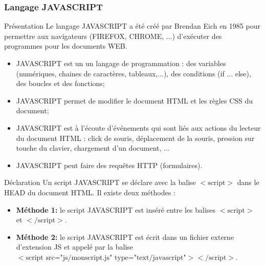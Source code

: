 \documentclass[8pt]{beamer}
\newcounter{num}
\begin{document}
\begin{frame}
\frametitle{Langage JAVASCRIPT}

\begin{block}{Présentation}
Le langage JAVASCRIPT a été créé par Brendan Eich en 1985 pour permettre aux navigateurs (FIREFOX, CHROME, ...) d'exécuter des programmes pour les documents WEB. 
\begin{itemize}
\item JAVASCRIPT est un un langage de programmation : des variables (numériques, chaines de caractères, tableaux,...), des conditions (if ... else), des boucles et des fonctions;
\item JAVASCRIPT permet de modifier le document HTML et les règles CSS du document;
\item JAVASCRIPT est à l'écoute d'événements qui sont liés aux actions du lecteur du document HTML : click de souris, déplacement de la souris, pression sur touche du clavier, chargement d'un document, ...
\item JAVASCRIPT peut faire des requêtes HTTP (formulaires).
\end{itemize}
\end{block}

\begin{block}{Déclaration}
Un script JAVASCRIPT se déclare avec la balise $<\text{script}>$ dans le HEAD du document HTML. Il existe deux méthodes :
\begin{itemize}
\item \textbf{Méthode 1:} le script JAVASCRIPT est inséré entre les balises $<\text{script}>$ et $</\text{script}>$.
\item \textbf{Méthode 2:} le script JAVASCRIPT est écrit dans un fichier externe d'extension JS et appelé par la balise $<\text{script src="js/monscript.js" type="text/javascript"}></\text{script}>$.
\end{itemize}
\end{block}
\end{frame}
\end{document}
